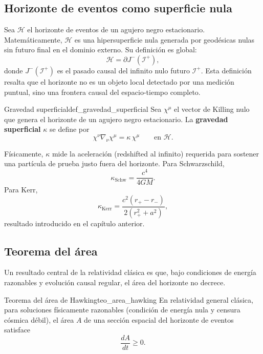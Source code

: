 \subsection{Horizonte de eventos como superficie nula}

Sea $\mathcal{H}$ el horizonte de eventos de un agujero negro estacionario. Matemáticamente, $\mathcal{H}$ es una hipersuperficie nula generada por geodésicas nulas sin futuro final en el dominio externo. Su definición es global:
\begin{equation}
  \mathcal{H} = \partial J^{-}(\mathscr{I}^{+}),
\end{equation}
donde $J^{-}(\mathscr{I}^{+})$ es el pasado causal del infinito nulo futuro $\mathscr{I}^{+}$. Esta definición resalta que el horizonte no es un objeto local detectado por una medición puntual, sino una frontera causal del espacio-tiempo completo.

\begin{definicion}{Gravedad superficial}{def_gravedad_superficial}
Sea $\chi^\mu$ el vector de Killing nulo que genera el horizonte de un agujero negro estacionario. La \textbf{gravedad superficial} $\kappa$ se define por
\begin{equation}
  \chi^\nu \nabla_\nu \chi^\mu = \kappa\,\chi^\mu
  \qquad \text{en } \mathcal{H}.
  \label{eq:def_kappa_bh}
\end{equation}
\end{definicion}

Físicamente, $\kappa$ mide la aceleración (redshifted al infinito) requerida para sostener una partícula de prueba justo fuera del horizonte. Para Schwarzschild,
\begin{equation}
  \kappa_{\text{Schw}} = \frac{c^4}{4GM}.
  \label{eq:kappa_schw_cap9}
\end{equation}
Para Kerr,
\begin{equation}
  \kappa_{\text{Kerr}} = \frac{c^2(r_+ - r_-)}{2(r_+^2 + a^2)},
\end{equation}
resultado introducido en el capítulo anterior.

\subsection{Teorema del área}

Un resultado central de la relatividad clásica es que, bajo condiciones de energía razonables y evolución causal regular, el área del horizonte no decrece.

\begin{teorema}{Teorema del área de Hawking}{teo_area_hawking}
En relatividad general clásica, para soluciones físicamente razonables (condición de energía nula y censura cósmica débil), el área $A$ de una sección espacial del horizonte de eventos satisface
\begin{equation}
  \frac{dA}{dt} \ge 0.
  \label{eq:teorema_area}
\end{equation}
\end{teorema}

